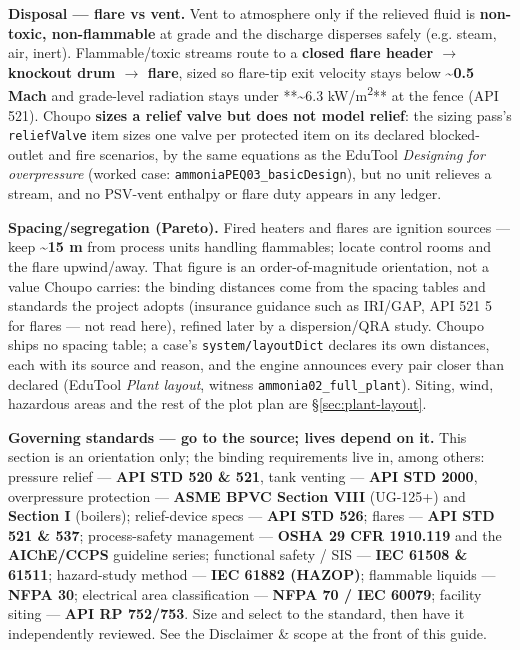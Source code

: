 \documentclass[11pt,a4paper]{article}
\begin{document}
\textbf{Disposal --- flare vs vent.} Vent to atmosphere only if the
relieved fluid is \textbf{non-toxic, non-flammable} at grade and the
discharge disperses safely (e.g. steam, air, inert). Flammable/toxic
streams route to a \textbf{closed flare header \(\rightarrow\) knockout drum \(\rightarrow\) flare},
sized so flare-tip exit velocity stays below
\textasciitilde{}\textbf{0.5 Mach} and grade-level radiation stays under
**\textasciitilde6.3 kW/m\textsuperscript{2}** at the fence (API 521). Choupo \textbf{sizes a relief valve but does not model
relief}: the sizing pass's \texttt{reliefValve} item sizes one valve per
protected item on its declared blocked-outlet and fire scenarios, by the
same equations as the EduTool \emph{Designing for overpressure} (worked
case: \texttt{ammoniaPEQ03\_basicDesign}), but no unit relieves a stream, and
no PSV-vent enthalpy or flare duty appears in any ledger.

\textbf{Spacing/segregation (Pareto).} Fired heaters and flares are
ignition sources --- keep \textbf{\textasciitilde15 m} from process
units handling flammables; locate control rooms and the flare
upwind/away. That figure is an order-of-magnitude orientation, not a value
Choupo carries: the binding distances come from the spacing tables and
standards the project adopts (insurance guidance such as IRI/GAP, API 521
\textsection{}5 for flares --- not read here), refined later by a
dispersion/QRA study. Choupo ships no spacing table; a case's
\texttt{system/layoutDict} declares its own distances, each with its source
and reason, and the engine announces every pair closer than declared
(EduTool \emph{Plant layout}, witness \texttt{ammonia02\_full\_plant}).
Siting, wind, hazardous areas and the rest of the plot plan are
\S\ref{sec:plant-layout}.

\textbf{Governing standards --- go to the source; lives depend on it.}
This section is an orientation only; the binding requirements live in,
among others: pressure relief --- \textbf{API STD 520 \& 521}, tank
venting --- \textbf{API STD 2000}, overpressure protection ---
\textbf{ASME BPVC Section VIII} (UG-125+) and \textbf{Section I}
(boilers); relief-device specs --- \textbf{API STD 526}; flares ---
\textbf{API STD 521 \& 537}; process-safety management --- \textbf{OSHA
29 CFR 1910.119} and the \textbf{AIChE/CCPS} guideline series;
functional safety / SIS --- \textbf{IEC 61508 \& 61511}; hazard-study
method --- \textbf{IEC 61882 (HAZOP)}; flammable liquids ---
\textbf{NFPA 30}; electrical area classification --- \textbf{NFPA 70 /
IEC 60079}; facility siting --- \textbf{API RP 752/753}. Size and select
to the standard, then have it independently reviewed. See the Disclaimer
\& scope at the front of this guide.
\end{document}
